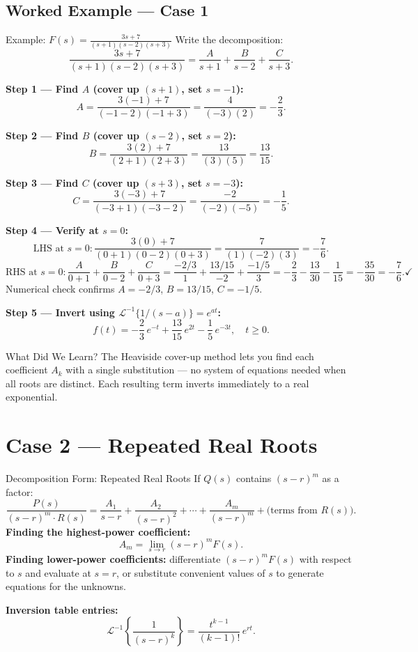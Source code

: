 \documentclass[12pt,a4paper]{article}
\begin{document}
\subsection{Worked Example --- Case 1}
\begin{infobox}{Example: $F(s)=\frac{3s+7}{(s+1)(s-2)(s+3)}$}
Write the decomposition:
\[
  \frac{3s+7}{(s+1)(s-2)(s+3)} = \frac{A}{s+1} + \frac{B}{s-2}
  + \frac{C}{s+3}.
\]

\textbf{Step 1 --- Find $A$ (cover up $(s+1)$, set $s=-1$):}
\[
  A = \frac{3(-1)+7}{(-1-2)(-1+3)} = \frac{4}{(-3)(2)} = -\frac{2}{3}.
\]

\textbf{Step 2 --- Find $B$ (cover up $(s-2)$, set $s=2$):}
\[
  B = \frac{3(2)+7}{(2+1)(2+3)} = \frac{13}{(3)(5)} = \frac{13}{15}.
\]

\textbf{Step 3 --- Find $C$ (cover up $(s+3)$, set $s=-3$):}
\[
  C = \frac{3(-3)+7}{(-3+1)(-3-2)} = \frac{-2}{(-2)(-5)} = -\frac{1}{5}.
\]

\textbf{Step 4 --- Verify at $s=0$:}
\[
  \text{LHS at } s=0: \frac{3(0)+7}{(0+1)(0-2)(0+3)} = \frac{7}{(1)(-2)(3)} = -\frac{7}{6}.
\]
\[
  \text{RHS at } s=0: \frac{A}{0+1} + \frac{B}{0-2} + \frac{C}{0+3}
  = \frac{-2/3}{1} + \frac{13/15}{-2} + \frac{-1/5}{3}
  = -\frac{2}{3} - \frac{13}{30} - \frac{1}{15} = -\frac{35}{30} = -\frac{7}{6}.\checkmark
\]
Numerical check confirms $A=-2/3$, $B=13/15$, $C=-1/5$.

\textbf{Step 5 --- Invert using $\mathcal{L}^{-1}\{1/(s-a)\}=e^{at}$:}
\[
  f(t) = -\frac{2}{3}\,e^{-t} + \frac{13}{15}\,e^{2t} - \frac{1}{5}\,e^{-3t},\quad t\geq 0.
\]
\end{infobox}

\begin{learnbox}{What Did We Learn?}
The Heaviside cover-up method lets you find each coefficient $A_k$ with a
single substitution --- no system of equations needed when all roots are
distinct. Each resulting term inverts immediately to a real exponential.
\end{learnbox}

\section{Case 2 --- Repeated Real Roots}
\begin{infobox}{Decomposition Form: Repeated Real Roots}
If $Q(s)$ contains $(s-r)^m$ as a factor:
\[
  \frac{P(s)}{(s-r)^m \cdot R(s)} =
  \frac{A_1}{s-r} + \frac{A_2}{(s-r)^2} + \cdots + \frac{A_m}{(s-r)^m}
  + \text{(terms from } R(s)\text{)}.
\]
\textbf{Finding the highest-power coefficient:}
\[
  A_m = \lim_{s \to r} (s-r)^m F(s).
\]
\textbf{Finding lower-power coefficients:} differentiate $(s-r)^m F(s)$
with respect to $s$ and evaluate at $s=r$, or substitute convenient
values of $s$ to generate equations for the unknowns.

\textbf{Inversion table entries:}
\[
  \mathcal{L}^{-1}\!\left\{\frac{1}{(s-r)^k}\right\} = \frac{t^{k-1}}{(k-1)!}\,e^{rt}.
\]
\end{infobox}
\end{document}
